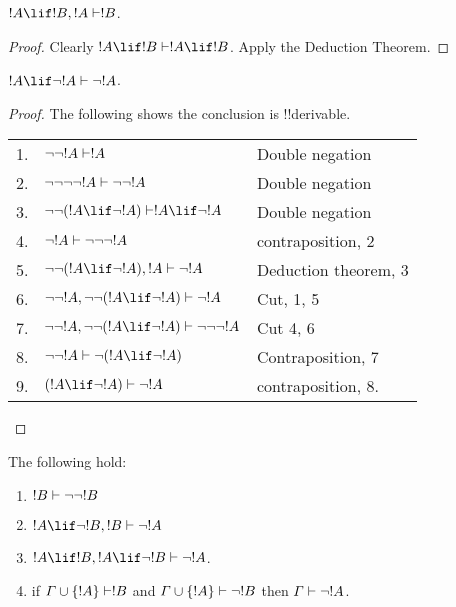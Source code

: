 \documentclass[../../include/open-logic-section]{subfiles}
\begin{document}
\begin{def}
  $!A \lif !B, !A \Proves !B$.
\end{def}

\begin{proof}
  Clearly $!A \lif !B \Proves !A\lif !B$. Apply the
  Deduction Theorem.
\end{proof}

\begin{def}
  $!A \lif \lnot !A \Proves \lnot !A$.
\end{def}

\begin{proof} The following shows the conclusion is !!{derivable}.
  
  \begin{tabular}{rll}
    1. & $\lnot\lnot!A \Proves !A$ & Double negation \\
    2. & $\lnot\lnot \lnot\lnot!A \Proves \lnot\lnot!A$
    & Double negation \\ 
    3. & $\lnot\lnot(!A \lif \lnot !A) \Proves !A
    \lif \lnot !A$ & Double negation\\
    4. & $\lnot!A \Proves \lnot\lnot\lnot !A$ &
    contraposition, 2\\ 
    5. & $\lnot\lnot(!A \lif \lnot !A), !A
    \Proves \lnot !A$ & Deduction theorem, 3 \\
    6. & $\lnot\lnot!A, \lnot\lnot(!A \lif \lnot
    !A) \Proves  \lnot !A$ & Cut, 1, 5 \\
    7. &  $\lnot\lnot!A, \lnot\lnot(!A \lif \lnot
    !A) \Proves  \lnot\lnot\lnot !A$ & Cut 4, 6 \\
    8. & $\lnot \lnot !A \Proves \lnot (!A \lif \lnot
    !A)$ & Contraposition, 7 \\
    9. & $(!A \lif \lnot !A) \Proves \lnot !A$ &
    contraposition, 8. 
 \end{tabular}

\end{proof}



\begin{prop}  
The following hold:
  \begin{enumerate}
  \item $!B \Proves \lnot \lnot !B$
  \item $!A \lif \lnot !B, !B \Proves \lnot!A$
  \item $!A\lif !B,!A\lif\lnot !B  \Proves
    \lnot!A$.    
  \item if $\Gamma \cup \{ !A \}\Proves !B$ and $\Gamma
    \cup \{ !A\} \Proves \lnot !B$ then $\Gamma \Proves
    \lnot!A$.    
  \end{enumerate}
\end{prop}
\end{document}
